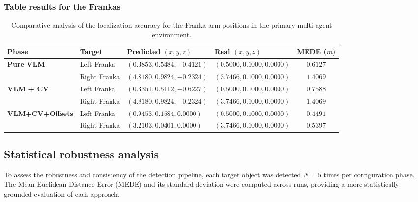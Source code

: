 \subsubsection{Table results for the Frankas} %
\begin{table}[H]
	\centering
	\small
	\begin{tabularx}{\textwidth}{l l X X c}
		\toprule
		\textbf{Phase} & \textbf{Target} & \textbf{Predicted $(x, y, z)$} & \textbf{Real $(x, y, z)$} & \textbf{MEDE ($m$)} \\
		\midrule
		\textbf{Pure VLM} 
		& Left Franka  & $(0.3853, 0.5484, -0.4121)$ & $(0.5000, 0.1000, 0.0000)$ & $0.6127$ \\
		& Right Franka & $(4.8180, 0.9824, -0.2324)$ & $(3.7466, 0.1000, 0.0000)$ & $1.4069$ \\
		\midrule
		\textbf{VLM + CV} 
		& Left Franka  & $(0.3351, 0.5112, -0.6227)$ & $(0.5000, 0.1000, 0.0000)$ & $0.7588$ \\
		& Right Franka & $(4.8180, 0.9824, -0.2324)$ & $(3.7466, 0.1000, 0.0000)$ & $1.4069$ \\
		\midrule
		\textbf{VLM+CV+Offsets} 
		& Left Franka  & $(0.9453, 0.1584, 0.0000)$  & $(0.5000, 0.1000, 0.0000)$ & $\mathbf{0.4491}$ \\
		& Right Franka & $(3.2103, 0.0401, 0.0000)$  & $(3.7466, 0.1000, 0.0000)$ & $\mathbf{0.5397}$ \\
		\bottomrule
	\end{tabularx}
	\caption{Comparative analysis of the localization accuracy for the Franka arm positions in the primary multi-agent environment.}
	\label{tab:franka_results}
\end{table}


\subsection{Statistical robustness analysis}
\label{sec:repeat}
To assess the robustness and consistency of the detection pipeline, each target object 
was detected $N=5$ times per configuration phase. The Mean Euclidean Distance Error 
(MEDE) and its standard deviation were computed across runs, providing a 
more statistically grounded evaluation of each approach.

